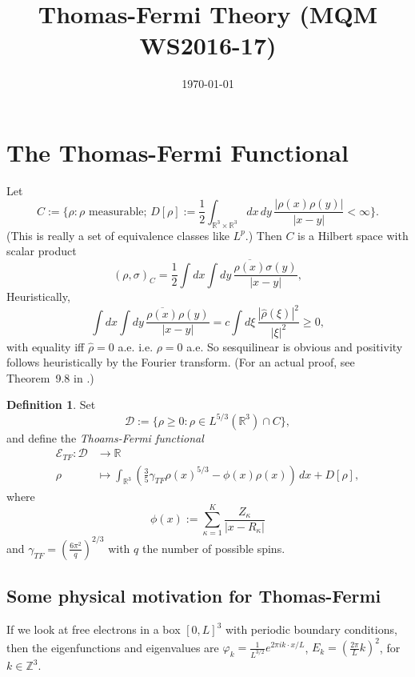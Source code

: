 \documentclass[11pt]{amsart}
\newcommand{\Z}{\mathbb{Z}}
\newcommand{\R}{\mathbb{R}}
\renewcommand{\hat}{\widehat}
\theoremstyle{definition}
\theoremstyle{definition}
\newtheorem{defn}{Definition}
\theoremstyle{definition}
\numberwithin{equation}{section}
\begin{document}
\title[]{Thomas-Fermi Theory (MQM WS2016-17)}
\date{\today}

\maketitle

\section{The Thomas-Fermi Functional}
Let 
\[
C:=\{\rho:\rho\text{ measurable};\,D[\rho]:=\frac{1}{2}\int_{\R^3\times\R^3}dx\,dy\,\frac{|\rho(x)\rho(y)|}{|x-y|}<\infty\}.
\] 
(This is really a set of equivalence classes like $L^p$.) Then $C$ is a Hilbert space with scalar product
\begin{equation}
(\rho,\sigma)_C=\frac{1}{2}\int dx\int dy\,\frac{\overline{\rho(x)}\sigma(y)}{|x-y|},
\end{equation}
Heuristically,
\[
\int dx\int dy\,\frac{\overline{\rho(x)}\rho(y)}{|x-y|}=c\int d\xi\,\frac{|\hat{\rho}(\xi)|^2}{|\xi|^2}\ge0,
\]
with equality iff $\hat{\rho}=0$ a.e. i.e. $\rho=0$ a.e. So sesquilinear is obvious and positivity follows heuristically by the Fourier transform. (For an actual proof, see Theorem~9.8 in \cite{lieb-loss}.)

\begin{defn}
Set
\begin{equation}
\mathcal{D}:=\{\rho\ge0:\rho\in L^{5/3}(\R^3)\cap C\},
\end{equation}
and define the \emph{Thoams-Fermi functional}
\begin{align}
\nonumber\mathcal{E}_{TF}:\mathcal{D}&\to\R\\
\rho&\mapsto\int_{\R^3}\left(\frac{3}{5}\gamma_{TF}\rho(x)^{5/3}-\phi(x)\rho(x)\right)\,dx+D[\rho],
\end{align}
where
\[
\phi(x):=\sum_{\kappa=1}^{K}\frac{Z_\kappa}{|x-R_\kappa|}
\]
and $\gamma_{TF}=\left(\frac{6\pi^2}{q}\right)^{2/3}$ with $q$ the number of possible spins.
\end{defn}

\subsection{Some physical motivation for Thomas-Fermi}

If we look at free electrons in a box $[0,L]^3$ with periodic boundary conditions, then the eigenfunctions and eigenvalues are $\varphi_k=\frac{1}{L^{3/2}}e^{2\pi ik\cdot x/L}$, $E_k=(\frac{2\pi}{L}k)^2$, for $k\in\Z^3$. 
\end{document}
